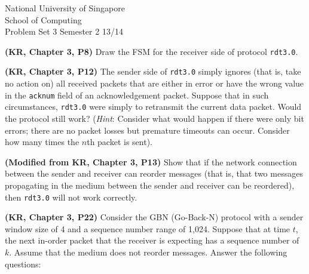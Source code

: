 \documentclass[a4paper,11pt]{exam}
\begin{document}
    \extraheadheight{.5in}
    {\large\sf National University of Singapore\\ School of Computing \\
    \LARGE\sf Problem Set 3}%
    {\large\sf Semester 2 13/14}
    \firstpageheadrule
    \pagestyle{headandfoot}

    \begin{questions}
	\question \textbf{(KR, Chapter 3, P8)} 
	Draw the FSM for the receiver side of protocol \texttt{rdt3.0}.

	\question \textbf{(KR, Chapter 3, P12)} 
	The sender side of \texttt{rdt3.0} simply ignores (that 
	is, take no action on) all received packets that are either 
	in error or have the wrong value in the \texttt{acknum} 
	field of an acknowledgement packet.  Suppose that in such 
	circumstances, \texttt{rdt3.0} were simply to retransmit 
	the current data packet.  Would the protocol still work?  
	(\textit{Hint}: Consider what would happen if there were 
	only bit errors; there are no packet losses but premature 
	timeouts can occur.  Consider how many times the $n$th packet 
	is sent).

	\question \textbf{(Modified from KR, Chapter 3, P13)} 
	Show that if the network connection between the sender and 
	receiver can reorder messages (that is, that two messages 
	propagating in the medium between the sender and receiver 
	can be reordered), then \texttt{rdt3.0} will not work correctly.  

%	

	\question \textbf{(KR, Chapter 3, P22)} 
	Consider the GBN (Go-Back-N) protocol with a sender window size of 4 and a sequence
	number range of 1,024. Suppose that at time $t$, the next in-order packet
	that the receiver is expecting has a sequence number of $k$. Assume that the
	medium does not reorder messages. Answer the following questions:
\end{questions}
\end{document}
